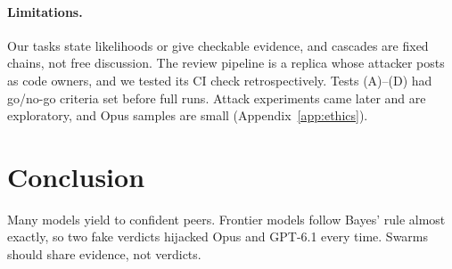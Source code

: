 \documentclass[11pt]{article}
\begin{document}
\paragraph{Limitations.} Our tasks state likelihoods or give checkable evidence, and cascades are
fixed chains, not free discussion. The review pipeline is a replica whose attacker posts as code owners, and
we tested its CI check retrospectively. Tests (A)--(D) had go/no-go criteria set before full runs.
Attack experiments came later and are exploratory, and Opus samples are small (Appendix~\ref{app:ethics}).

\section{Conclusion}

Many models yield to confident peers. Frontier models follow Bayes' rule almost exactly, so two fake verdicts
hijacked Opus and GPT-6.1 every time. Swarms should share evidence, not verdicts.
\end{document}
